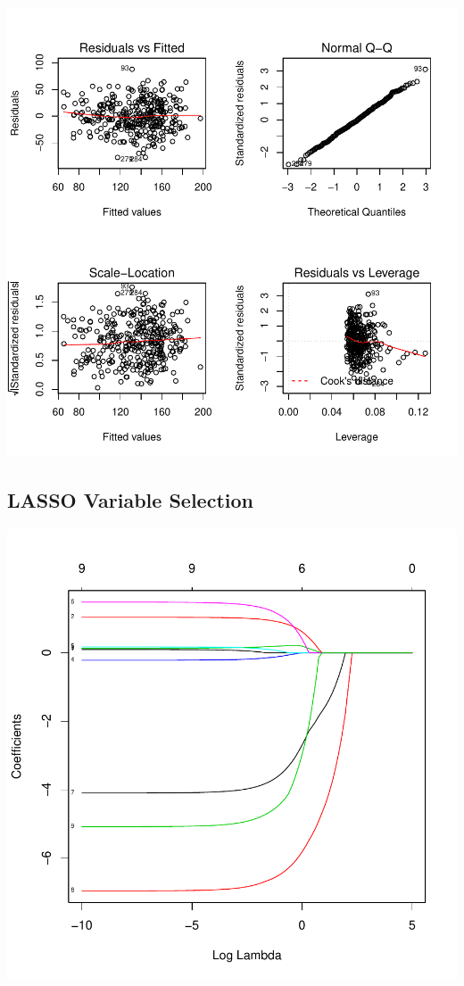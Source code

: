 \documentclass[11pt, a4paper]{article}
\begin{document}
\includegraphics{regression-014}






\pagebreak
\subsection{LASSO Variable Selection}

\includegraphics{regression-015}
\end{document}
